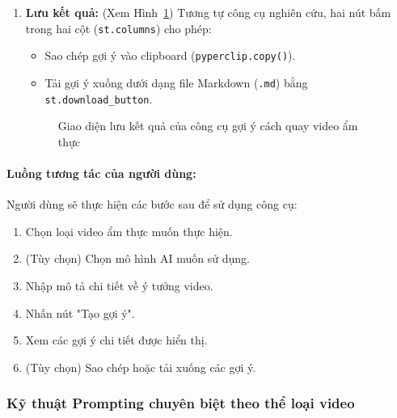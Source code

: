 \begin{enumerate}
    \item \textbf{Lưu kết quả:} (Xem Hình~\ref{fig:suggestion_save_result}) Tương tự công cụ nghiên cứu, hai nút bấm trong hai cột (\texttt{st.columns}) cho phép:
    \begin{itemize}
        \item Sao chép gợi ý vào clipboard (\texttt{pyperclip.copy()}).
        
        \item Tải gợi ý xuống dưới dạng file Markdown (\texttt{.md}) bằng \texttt{st.download\_button}.
    \end{itemize}
    \begin{figure}[H]
        \centering
        \caption{Giao diện lưu kết quả của công cụ gợi ý cách quay video ẩm thực}
        \label{fig:suggestion_save_result}
    \end{figure}

\end{enumerate}

\paragraph{Luồng tương tác của người dùng:} Người dùng sẽ thực hiện các bước sau để sử dụng công cụ:
\begin{enumerate}
    \item Chọn loại video ẩm thực muốn thực hiện.

    \item (Tùy chọn) Chọn mô hình AI muốn sử dụng.
    
    \item Nhập mô tả chi tiết về ý tưởng video.
    
    \item Nhấn nút "Tạo gợi ý".
    
    \item Xem các gợi ý chi tiết được hiển thị.
    
    \item (Tùy chọn) Sao chép hoặc tải xuống các gợi ý.
\end{enumerate}

\subsubsection{Kỹ thuật Prompting chuyên biệt theo thể loại video}


